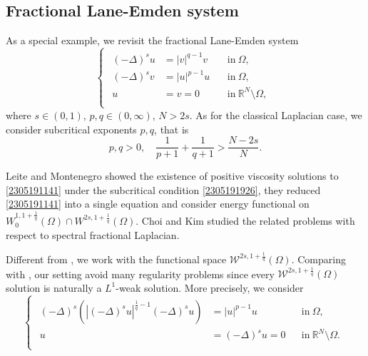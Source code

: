 \documentclass[10pt]{article}
\numberwithin{equation}{section}
\numberwithin{equation}{section}
\begin{document}
\subsection{Fractional Lane-Emden system}
As a special example, we revisit the fractional Lane-Emden system
\begin{equation}\label{2305191141}
\begin{cases}
\begin{aligned}
(-\Delta)^{s} u&=|v|^{q-1}v \,&&\text{in}~\Omega,\\
(-\Delta)^{s} v&=|u|^{p-1}u \,&&\text{in}~\Omega,\\
u &= v = 0 &&\text{in} ~ \mathbb{R}^N\setminus\Omega,\\
\end{aligned}
\end{cases}
\end{equation}
where $s\in (0, 1)$, $p, q\in (0, \infty)$, $N>2s$. As for the  classical Laplacian case, we consider subcritical exponents $p, q$, that is
\begin{equation}\label{2305191926}
p, q>0,\quad\frac{1}{p+1}+\frac{1}{q+1}>\frac{N-2s}{N}.
\end{equation}

Leite and Montenegro \cite{LM2019} showed the existence of positive viscosity solutions to \eqref{2305191141} under the subcritical condition \eqref{2305191926}, they reduced \eqref{2305191141} into a single equation and consider energy functional on $W_0^{1, 1+\frac1q}(\Omega)\cap W^{2s, 1+\frac1q}(\Omega)$.
 Choi and Kim \cite{CK2019, Choi2015} studied the related problems with respect to spectral fractional Laplacian.

Different from \cite{LM2019}, we work with the functional space $\mathcal{W}^{2s, 1+\frac1q}(\Omega)$.
Comparing with \cite{LM2019}, our setting avoid many regularity problems since every $\mathcal{W}^{2s, 1+\frac1q}(\Omega)$ solution is naturally a $L^1$-weak solution. More precisely, we consider
\begin{equation}\label{2305282030}
\begin{cases}
\begin{aligned}
(-\Delta)^{s}\left(|(-\Delta)^{s}u|^{\frac1q-1}(-\Delta)^{s}u\right) &=|u|^{p-1}u  \;&&\text{in}~\Omega,\\
u &=(-\Delta)^{s}u=0  &&\text{in} ~ \mathbb{R}^N\setminus\Omega.\\
\end{aligned}
\end{cases}
\end{equation}
\end{document}
